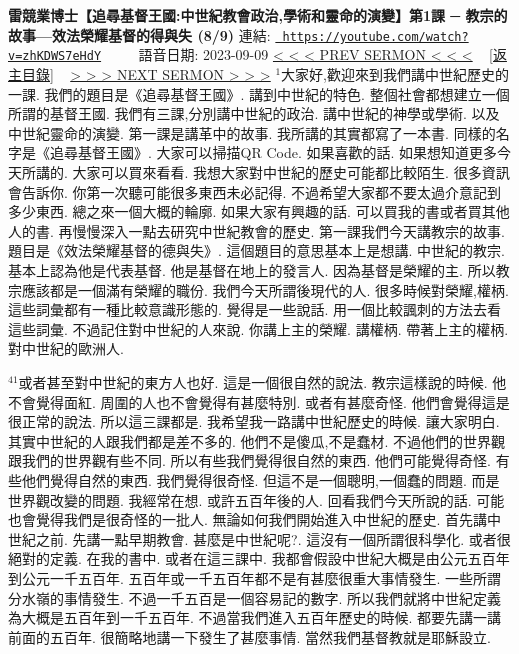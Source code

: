 \documentclass{book}
\begin{document}
\section{}
\label{sec:zhKDWS7eHdY}
\textbf{雷競業博士【追尋基督王國:中世紀教會政治,學術和靈命的演變】第1課 ─ 教宗的故事—效法榮耀基督的得與失 (8/9)}
\newline
\newline
連結: \href{https://youtube.com/watch?v=zhKDWS7eHdY}{\texttt{ https://youtube.com/watch?v=zhKDWS7eHdY}} ~~~~ 語音日期: 2023-09-09 
\newline
\newline
\hyperref[sec:hNm147B1MpE]{\small{< < < PREV SERMON < < <}}
~
\hyperref[sec:index]{\small{[返主目錄]}}
~
\hyperref[sec:cveuS8m2O7k]{\small{> > > NEXT SERMON > > >}}
\newline
\newline
$^{1}$大家好,歡迎來到我們講中世紀歷史的一課.
我們的題目是《追尋基督王國》.
講到中世紀的特色.
整個社會都想建立一個所謂的基督王國.
我們有三課,分別講中世紀的政治.
講中世紀的神學或學術.
以及中世紀靈命的演變.
第一課是講革中的故事.
我所講的其實都寫了一本書.
同樣的名字是《追尋基督王國》.
大家可以掃描QR Code.
如果喜歡的話.
如果想知道更多今天所講的.
大家可以買來看看.
我想大家對中世紀的歷史可能都比較陌生.
很多資訊會告訴你.
你第一次聽可能很多東西未必記得.
不過希望大家都不要太過介意記到多少東西.
總之來一個大概的輪廓.
如果大家有興趣的話.
可以買我的書或者買其他人的書.
再慢慢深入一點去研究中世紀教會的歷史.
第一課我們今天講教宗的故事.
題目是《效法榮耀基督的德與失》.
這個題目的意思基本上是想講.
中世紀的教宗.
基本上認為他是代表基督.
他是基督在地上的發言人.
因為基督是榮耀的主.
所以教宗應該都是一個滿有榮耀的職份.
我們今天所謂後現代的人.
很多時候對榮耀,權柄.
這些詞彙都有一種比較意識形態的.
覺得是一些說話.
用一個比較諷刺的方法去看這些詞彙.
不過記住對中世紀的人來說.
你講上主的榮耀.
講權柄.
帶著上主的權柄.
對中世紀的歐洲人.

$^{41}$或者甚至對中世紀的東方人也好.
這是一個很自然的說法.
教宗這樣說的時候.
他不會覺得面紅.
周圍的人也不會覺得有甚麼特別.
或者有甚麼奇怪.
他們會覺得這是很正常的說法.
所以這三課都是.
我希望我一路講中世紀歷史的時候.
讓大家明白.
其實中世紀的人跟我們都是差不多的.
他們不是傻瓜,不是蠢材.
不過他們的世界觀跟我們的世界觀有些不同.
所以有些我們覺得很自然的東西.
他們可能覺得奇怪.
有些他們覺得自然的東西.
我們覺得很奇怪.
但這不是一個聰明,一個蠢的問題.
而是世界觀改變的問題.
我經常在想.
或許五百年後的人.
回看我們今天所說的話.
可能也會覺得我們是很奇怪的一批人.
無論如何我們開始進入中世紀的歷史.
首先講中世紀之前.
先講一點早期教會.
甚麼是中世紀呢?.
這沒有一個所謂很科學化.
或者很絕對的定義.
在我的書中.
或者在這三課中.
我都會假設中世紀大概是由公元五百年到公元一千五百年.
五百年或一千五百年都不是有甚麼很重大事情發生.
一些所謂分水嶺的事情發生.
不過一千五百是一個容易記的數字.
所以我們就將中世紀定義為大概是五百年到一千五百年.
不過當我們進入五百年歷史的時候.
都要先講一講前面的五百年.
很簡略地講一下發生了甚麼事情.
當然我們基督教就是耶穌設立.
\end{document}
